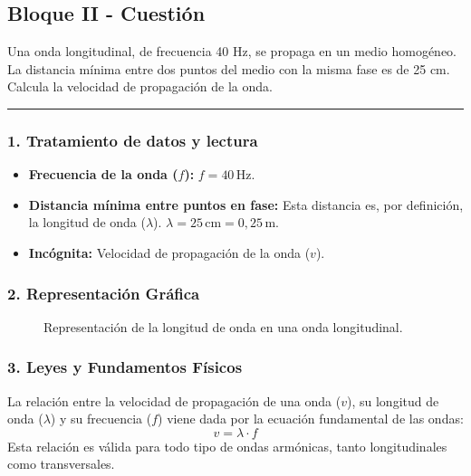 \newpage

\subsection{Bloque II - Cuestión}
\label{subsec:B2_2013_jul_ext}

\begin{cajaenunciado}
Una onda longitudinal, de frecuencia 40 Hz, se propaga en un medio homogéneo. La distancia mínima entre dos puntos del medio con la misma fase es de 25 cm. Calcula la velocidad de propagación de la onda.
\end{cajaenunciado}
\hrule

\subsubsection*{1. Tratamiento de datos y lectura}
\begin{itemize}
    \item \textbf{Frecuencia de la onda ($f$):} $f = 40\,\text{Hz}$.
    \item \textbf{Distancia mínima entre puntos en fase:} Esta distancia es, por definición, la longitud de onda ($\lambda$).
    $\lambda = 25\,\text{cm} = 0,25\,\text{m}$.
    \item \textbf{Incógnita:} Velocidad de propagación de la onda ($v$).
\end{itemize}

\subsubsection*{2. Representación Gráfica}
\begin{figure}[H]
    \centering
    \caption{Representación de la longitud de onda en una onda longitudinal.}
\end{figure}

\subsubsection*{3. Leyes y Fundamentos Físicos}
La relación entre la velocidad de propagación de una onda ($v$), su longitud de onda ($\lambda$) y su frecuencia ($f$) viene dada por la ecuación fundamental de las ondas:
$$ v = \lambda \cdot f $$
Esta relación es válida para todo tipo de ondas armónicas, tanto longitudinales como transversales.

